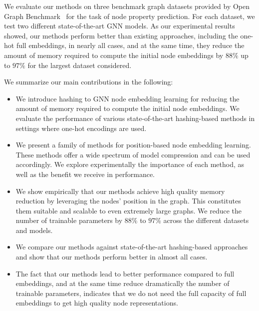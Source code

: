 \documentclass[conference]{IEEEtran}
\begin{document}
We evaluate our methods on three benchmark graph datasets provided by Open Graph Benchmark~\cite{hu2020open} for the task of node property prediction. For each dataset, we test two different state-of-the-art GNN models. As our experimental results showed, our methods perform better than existing approaches, including the one-hot full embeddings, in nearly all cases, and at the same time, they reduce the amount of memory required to compute the initial node embeddings by $88\%$ up to $97\%$ for the largest dataset considered. 



We summarize our main contributions in the following:
\begin{itemize}
    \item We introduce hashing to GNN node embedding learning for reducing the amount of memory required to compute the initial node embeddings. We evaluate the performance of various state-of-the-art hashing-based methods in settings where one-hot encodings are used.
    \item We present a family of methods for position-based node embedding learning. These methods offer a wide spectrum of model compression and can be used accordingly.
    We explore experimentally the importance of each method, as well as the benefit we receive in performance. 
    \item We show empirically that our methods achieve high quality memory reduction by leveraging the nodes' position in the graph. This constitutes them suitable and scalable to even extremely large graphs. We reduce the number of trainable parameters by $88\%$ to $97\%$ across the different datasets and models. 
    \item We compare our methods against state-of-the-art hashing-based approaches and show that our methods perform better in almost all cases.
    \item The fact that our methods lead to better performance compared to full embeddings, and at the same time reduce dramatically the number of trainable parameters, indicates that we do not need the full capacity of full embeddings to get high quality node representations.  
\end{itemize}
\end{document}
